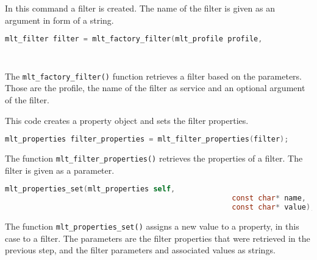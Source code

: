 \documentclass[../MasterThesis.tex]{subfiles}
\begin{document}
\begin{description}[font=\color{RedViolet!80!black}, style=nextline]
	
	
	\item[Create a filter] 
	
	In this command a filter is created. The name of the filter is given as an argument in form of a string.
	
	\begin{lstlisting}[language=C, numbers=none, columns=fullflexible, belowskip=0pt, aboveskip=9pt]
	mlt_filter filter = mlt_factory_filter(mlt_profile profile, 
																						const char* service, 
																						const void* input); \end{lstlisting}
														
	The \texttt{mlt\_factory\_filter()} function retrieves a filter based on the parameters. Those are the profile, the name of the filter as service and an optional argument of the filter.



	\item[Create and set filter properties] 

	This code creates a property object and sets the filter properties.

	\begin{lstlisting}[language=C, numbers=none, columns=fullflexible, belowskip=0pt, aboveskip=9pt]
	mlt_properties filter_properties = mlt_filter_properties(filter); \end{lstlisting}

	The function \texttt{mlt\_filter\_properties()} retrieves the properties of a filter. The filter is given as a parameter.

	\begin{lstlisting}[language=C, numbers=none, columns=fullflexible, belowskip=0pt, aboveskip=9pt]
	mlt_properties_set(mlt_properties self, 
													const char* name, 
													const char* value); \end{lstlisting}

	The function \texttt{mlt\_properties\_set()} assigns a new value to a property, in this case to a filter. The parameters are the filter properties that were retrieved in the previous step, and the filter parameters and associated values as strings.
	
	
	
	
	\item[Connect elements] 
	

\end{description}
\end{document}
